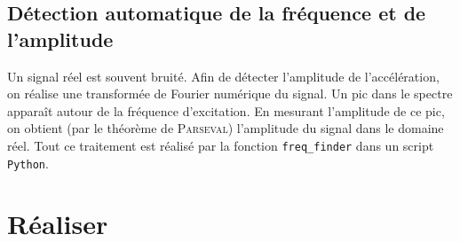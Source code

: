 \documentclass[a4paper, 11pt, final, garamond]{book}
\begin{document}
\subsection{Détection automatique de la fréquence et de l'amplitude}

Un signal réel est souvent bruité. Afin de détecter l'amplitude de
l'accélération, on réalise une transformée de Fourier numérique du signal. Un
pic dans le spectre apparaît autour de la fréquence d'excitation. En mesurant
l'amplitude de ce pic, on obtient (par le théorème de \textsc{Parseval})
l'amplitude du signal dans le domaine réel. Tout ce traitement est réalisé par
la fonction \texttt{freq\_finder} dans un script \texttt{Python}.

\section{Réaliser}
\end{document}
